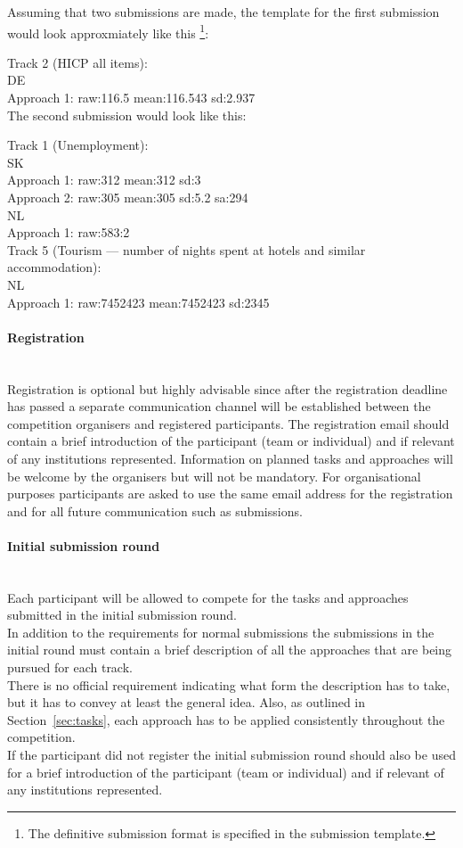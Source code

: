 \documentclass[12pt]{article}
\begin{document}
Assuming that two submissions are made, the template for the first submission would look approxmiately like this \footnote{The definitive submission format is specified in the submission template.}:

Track 2 (HICP all items):\\
DE\\
Approach 1: raw:116.5 mean:116.543 sd:2.937\\

The second submission would look like this:

Track 1 (Unemployment):\\
SK\\
Approach 1: raw:312 mean:312 sd:3\\
Approach 2: raw:305 mean:305 sd:5.2  sa:294\\
NL\\
Approach 1: raw:583:2\\
Track 5 (Tourism — number of nights spent at hotels and similar accommodation):\\
NL\\
Approach 1: raw:7452423 mean:7452423 sd:2345\\


\paragraph{Registration}

\textbf{ }\\
Registration is optional but highly advisable since after the registration deadline has passed a separate communication channel will be established between the competition organisers and registered participants.
The registration email should contain a brief introduction of the participant (team or individual) and if relevant of any institutions represented. Information on planned tasks and approaches will be welcome by the organisers but will not be mandatory. For organisational purposes participants are asked to use the same email address for the registration and for all future communication such as submissions.

\paragraph{Initial submission round}

\textbf{ }\\
Each participant will be allowed to compete for the tasks and approaches submitted in the initial submission round. \\
In addition to the requirements for normal submissions the submissions in the initial round must contain a brief description of all the approaches that are being pursued for each track. \\
There is no official requirement indicating what form the description has to take, but it has to convey at least the general idea. Also, as outlined in Section~\ref{sec:tasks}, each approach has to be applied consistently throughout the competition. \\
If the participant did not register the initial submission round should also be used for a brief introduction of the participant (team or individual) and if relevant of any institutions represented.
\end{document}
